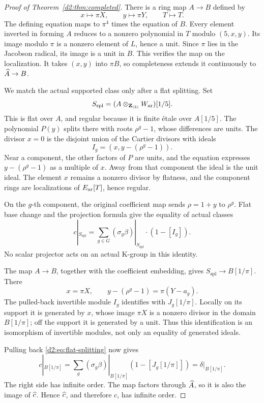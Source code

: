 \begin{proof}[Proof of Theorem~\ref{d2:thm:completed}]
There is a ring map \(A\to B\) defined by
\[
 x\longmapsto\pi X,\qquad y\longmapsto\pi Y,
 \qquad T\longmapsto T.
\]
The defining equation maps to \(\pi^4\) times the equation of \(B\).
Every element inverted in forming \(A\) reduces to a nonzero
polynomial in \(T\) modulo \((5,x,y)\).
Its image modulo \(\pi\) is a nonzero element of \(L\), hence a
unit. Since \(\pi\) lies in the Jacobson radical, its image is
a unit in \(B\).
This verifies the map on the localization.
It takes \((x,y)\) into \(\pi B\), so completeness extends it
continuously to \(\widehat A\to B\).

We match the actual supported class only after a flat splitting.
Set
\[
 S_{\mathrm{spl}}=
 (A\otimes_{\mathbf{Z}_{(5)}}W_{\mathrm{ar}})[1/5].
\]
This is flat over \(A\), and regular because it is finite \'etale
over \(A[1/5]\).
The polynomial \(P(y)\) splits there with roots \(\rho^g-1\),
whose differences are units.
The divisor \(x=0\) is the disjoint union of the Cartier divisors
with ideals
\[
 I_g=(x,y-(\rho^g-1)).
\]
Near a component, the other factors of \(P\) are units, and the
equation expresses \(y-(\rho^g-1)\) as a multiple of \(x\).
Away from that component the ideal is the unit ideal.
The element \(x\) remains a nonzero divisor by flatness, and the
component rings are localizations of \(E_{\mathrm{ar}}[T]\), hence regular.

On the \(g\)-th component, the original coefficient map sends
\(\rho=1+y\) to \(\rho^g\).
Flat base change and the projection formula give the equality of
actual classes
\begin{equation}\label{d2:eq:flat-splitting}
 c|_{S_{\mathrm{spl}}}
   =\sum_{g\in G}(\sigma_g\beta)|_{S_{\mathrm{spl}}}
                         \cdot(1-[I_g]).
\end{equation}
No scalar projector acts on an actual K-group in this identity.

The map \(A\to B\), together with the coefficient embedding,
gives \(S_{\mathrm{spl}}\to B[1/\pi]\).
There
\[
 x=\pi X,\qquad
 y-(\rho^g-1)=\pi(Y-a_g).
\]
The pulled-back invertible module \(I_g\) identifies with
\(J_g[1/\pi]\).
Locally on its support it is generated by \(x\), whose image
\(\pi X\) is a nonzero divisor in the domain \(B[1/\pi]\);
off the support it is generated by a unit.
Thus this identification is an isomorphism of invertible modules,
not only an equality of generated ideals.

Pulling back \eqref{d2:eq:flat-splitting} now gives
\[
 c|_{B[1/\pi]}
 =\sum_g(\sigma_g\beta)|_{B[1/\pi]}
                          (1-[J_g[1/\pi]])
 =\delta|_{B[1/\pi]}.
\]
The right side has infinite order.
The map factors through \(\widehat A\), so it is also the image of
\(\widehat c\). Hence \(\widehat c\), and therefore \(c\), has infinite order.


\end{proof}
